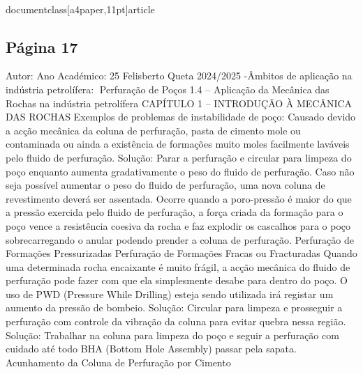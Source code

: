 \\documentclass[a4paper,11pt]{article}
\begin{document}
\subsection*{Página 17}
Autor:
Ano Académico:
25
Felisberto Queta
2024/2025
-Âmbitos de aplicação na indústria petrolífera:
Perfuração de Poços
1.4 – Aplicação da Mecânica das Rochas na indústria petrolífera
CAPÍTULO 1 – INTRODUÇÃO À MECÂNICA DAS ROCHAS
Exemplos de problemas de instabilidade de poço:
Causado devido a acção mecânica 
da coluna de perfuração, pasta de 
cimento mole ou contaminada ou 
ainda a existência de formações 
muito moles facilmente laváveis pelo 
fluido de perfuração.
Solução: Parar a perfuração e circular 
para limpeza do poço enquanto aumenta 
gradativamente o peso do fluido de 
perfuração. Caso não seja possível 
aumentar o peso do fluido de perfuração, 
uma nova coluna de revestimento deverá 
ser assentada.
Ocorre quando a poro-pressão é maior do 
que a pressão exercida pelo fluido de 
perfuração, a força criada da formação 
para o poço vence a resistência coesiva da 
rocha e faz explodir os cascalhos para o 
poço sobrecarregando o anular podendo 
prender a coluna de perfuração.
Perfuração de
Formações
Pressurizadas
Perfuração de
Formações
Fracas ou
Fracturadas
Quando uma determinada rocha encaixante 
é muito frágil, a acção mecânica do fluido de 
perfuração pode fazer com que ela 
simplesmente desabe para dentro do poço. 
O uso de PWD (Pressure While Drilling) 
esteja sendo utilizada irá registar um 
aumento da pressão de bombeio.
Solução: Circular para limpeza e prosseguir 
a perfuração com controle da vibração da 
coluna para evitar quebra nessa região.
Solução: Trabalhar na coluna para 
limpeza do poço e seguir a 
perfuração com cuidado até todo 
BHA (Bottom Hole Assembly) passar 
pela sapata.
Acunhamento
da Coluna de
Perfuração por
Cimento 
\end{document}
